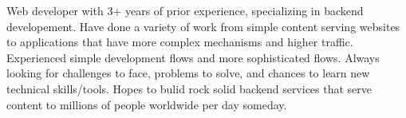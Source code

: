 

\begin{cvparagraph}

Web developer with 3+ years of prior experience, specializing in backend developement. Have done a variety of work from simple content serving websites to applications that have more complex mechanisms and higher traffic. Experienced simple development flows and more sophisticated flows. Always looking for challenges to face, problems to solve, and chances to learn new technical skills/tools. Hopes to bulid rock solid backend services that serve content to millions of people worldwide per day someday.
\end{cvparagraph}
